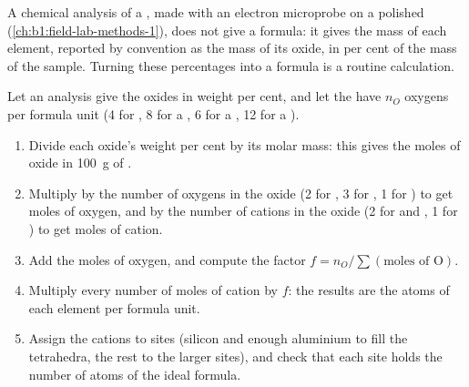 A chemical analysis of a , made with an electron microprobe on a
polished  (\cref{ch:b1:field-lab-methods-1}), does not give a
formula: it gives the mass of each element, reported by convention as the
mass of its oxide, in per cent of the mass of the sample. Turning these
percentages into a formula is a routine calculation.

\begin{method}\label{met:b1:rock-forming-minerals:recalculation}
Let an analysis give the oxides in weight per cent, and let the  have
$n_O$ oxygens per formula unit (4 for , 8 for a , 6 for a
, 12 for a ).
\begin{enumerate}
  \item Divide each oxide's weight per cent by its molar mass: this gives the
        moles of oxide in \qty{100}{g} of .
  \item Multiply by the number of oxygens in the oxide (2 for , 3
        for , 1 for ) to get moles of oxygen, and by the
        number of cations in the oxide (2 for  and , 1
        for ) to get moles of cation.
  \item Add the moles of oxygen, and compute the factor
        $f = n_O / \sum(\text{moles of O})$.
  \item Multiply every number of moles of cation by $f$: the results are the
        atoms of each element per formula unit.
  \item Assign the cations to sites (silicon and enough aluminium to fill the
        tetrahedra, the rest to the larger sites), and check that each site
        holds the number of atoms of the ideal formula.
\end{enumerate}
\end{method}

